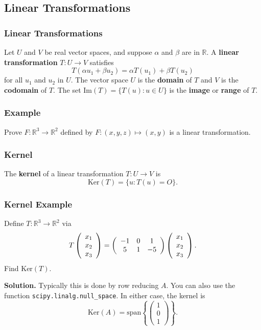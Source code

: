 \documentclass{beamer}
\begin{document}
\subsection{Linear Transformations}

\begin{frame}
\frametitle{Linear Transformations}
\begin{Definition}
Let $U$ and $V$ be real vector spaces, and suppose $\alpha$ and $\beta$ are in $\mathbb{R}$. A {\bf linear transformation} $T: U\to V$ satisfies 
$$
T(\alpha u_1 + \beta u_2) = \alpha T(u_1) + \beta T(u_2)
$$
for all $u_1$ and $u_2$ in $U$. The vector space $U$ is the {\bf domain} of $T$ and $V$ is the {\bf codomain} of $T$. The set $\text{Im}(T) = \{T(u) : u\in U\}$ is the {\bf image} or {\bf range} of $T$.
\end{Definition}

\end{frame}

\begin{frame}[t]
\frametitle{Example}
\begin{Example}
Prove $F: \mathbb{R}^3\to\mathbb{R}^2$ defined by $F:(x, y, z)\mapsto (x, y)$ is a linear transformation.
\end{Example}

\end{frame}

\begin{frame}
\frametitle{Kernel}
\begin{Definition}
The {\bf kernel} of a linear transformation $T:U\to V$ is 
$$
\text{Ker}(T) = \{u : T(u) = O\}.
$$
\end{Definition}
\end{frame}

\begin{frame}
\frametitle{Kernel Example}
\tiny
\begin{Example}
Define $T: \mathbb{R}^3\to \mathbb{R}^2$ via
$$
T\left(\begin{array}{c} x_1\\ x_2\\ x_3\end{array}\right) = \left(\begin{array}{c c c} -1	&	0	&	1\\  5		&	1	&	-5\end{array}\right) \left(\begin{array}{c} x_1\\ x_2\\ x_3\end{array}\right).
$$
Find $\text{Ker}(T)$.
\end{Example}

{\bf Solution.} Typically this is done by row reducing $A$. You can also use the function \texttt{scipy.linalg.null\_space}. In either case, the kernel is
$$
\text{Ker}(A) = \text{span}\left\{\left(\begin{array}{c} 1\\ 0\\ 1\end{array}\right)\right\}.
$$
\end{frame}
\end{document}
